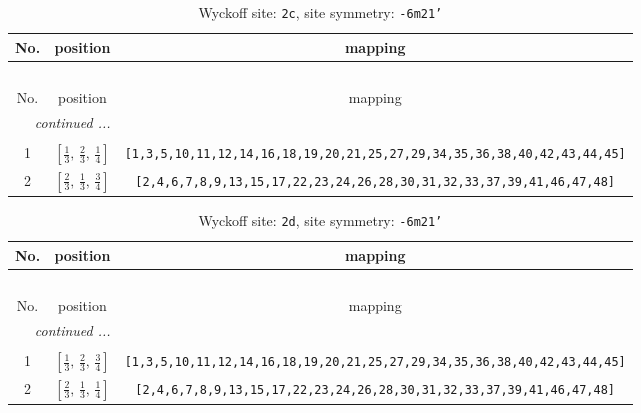 \documentclass[fleqn,8pt]{jsarticle}
\begin{document}
\renewcommand{\arraystretch}{1.2}
\begin{longtable}{ccc}
\caption{Wyckoff site: {\tt 2c}, site symmetry: {\tt -6m21'}}
 \\
 \hline \hline
No. & position & mapping \\ \hline \endfirsthead

\multicolumn{2}{l}{\tablename\ \thetable{}} \\
 \hline \hline
No. & position & mapping \\ \hline \endhead

 \hline \hline
\multicolumn{2}{r}{\footnotesize\it continued ...} \\ \endfoot

 \hline \hline
\multicolumn{2}{r}{} \\ \endlastfoot

1 & $\left[ \frac{1}{3},\, \frac{2}{3},\, \frac{1}{4} \right]$ & {\tt [1,3,5,10,11,12,14,16,18,19,20,21,25,27,29,34,35,36,38,40,42,43,44,45]} \\ \hline
2 & $\left[ \frac{2}{3},\, \frac{1}{3},\, \frac{3}{4} \right]$ & {\tt [2,4,6,7,8,9,13,15,17,22,23,24,26,28,30,31,32,33,37,39,41,46,47,48]} \\
\end{longtable}
\renewcommand{\arraystretch}{1.2}
\begin{longtable}{ccc}
\caption{Wyckoff site: {\tt 2d}, site symmetry: {\tt -6m21'}}
 \\
 \hline \hline
No. & position & mapping \\ \hline \endfirsthead

\multicolumn{2}{l}{\tablename\ \thetable{}} \\
 \hline \hline
No. & position & mapping \\ \hline \endhead

 \hline \hline
\multicolumn{2}{r}{\footnotesize\it continued ...} \\ \endfoot

 \hline \hline
\multicolumn{2}{r}{} \\ \endlastfoot

1 & $\left[ \frac{1}{3},\, \frac{2}{3},\, \frac{3}{4} \right]$ & {\tt [1,3,5,10,11,12,14,16,18,19,20,21,25,27,29,34,35,36,38,40,42,43,44,45]} \\ \hline
2 & $\left[ \frac{2}{3},\, \frac{1}{3},\, \frac{1}{4} \right]$ & {\tt [2,4,6,7,8,9,13,15,17,22,23,24,26,28,30,31,32,33,37,39,41,46,47,48]} \\
\end{longtable}
\renewcommand{\arraystretch}{1.2}
\end{document}
